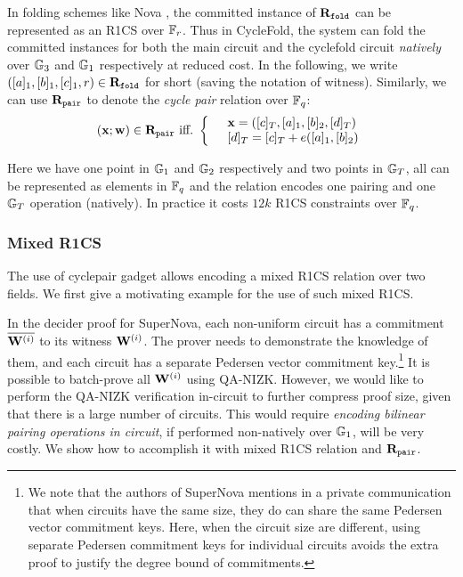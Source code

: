 In folding schemes like Nova \cite{Nova},
the committed instance of $\mathbf{R}_\texttt{fold}$ can be represented
as an R1CS over $\mathbb{F}_r$. Thus in CycleFold, the system
can fold the committed instances for both the main circuit and
the cyclefold circuit {\em natively} over ${\mathbb{G}}_3$ and ${\mathbb{G}}_1$ respectively
at reduced cost.  In the following, we write
$([a]_1, [b]_1, [c]_1, r) \in \mathbf{R}_\texttt{fold}$ for short (saving the
notation of witness). Similarly, we can use $\mathbf{R}_\texttt{pair}$
to denote the {\em cycle pair} relation over $\mathbb{F}_q$:
\[
	({{\mathbf {x}}};{{\mathbf {w}}}) \in \mathbf{R}_\texttt{pair}~\textrm{iff.}~
	\left\{
	\begin{array} {l l}
		& {{\mathbf {x}}} = ([c]_T, [a]_1, [b]_2, [d]_T)  \\
		& [d]_T = [c]_T + e([a]_1, [b]_2) \\
	\end{array}
	\right.
\]

Here we have one point in ${\mathbb{G}}_1$ and ${\mathbb{G}}_2$ respectively and
two points in ${\mathbb{G}}_T$, all can be represented as elements in 
$\mathbb{F}_q$ and the relation encodes one pairing and one ${\mathbb{G}}_T$
operation (natively). In practice it costs $12k$ R1CS constraints
over $\mathbb{F}_q$.

\subsubsection{Mixed R1CS} The use of cyclepair gadget allows
encoding a mixed R1CS relation over two fields. We first
give a motivating example for the use of such mixed R1CS. 

In the decider proof for SuperNova, each non-uniform circuit has
a commitment $\overline{{{\mathbf {W}}}^{(i)}}$ to its witness 
${{\mathbf {W}}}^{(i)}$. The prover needs to demonstrate the knowledge
of them, and each circuit has a separate Pedersen vector commitment 
key.\footnote{We note
that the authors of SuperNova mentions in a private communication that
when circuits have the same size, they do can share the same Pedersen
vector commitment keys. Here, when the circuit size are different, 
using separate Pedersen commitment keys for individual circuits
avoids the extra proof to justify the degree bound of
commitments.} It is possible to batch-prove all ${{\mathbf {W}}}^{(i)}$
using QA-NIZK. However, we would like to perform the QA-NIZK verification
in-circuit to further compress proof size, given that there is a large
number of circuits.  This would require
{\em encoding bilinear pairing operations in circuit}, if performed
non-natively over ${\mathbb{G}}_1$, will be very costly.  We show how to
accomplish it with mixed R1CS relation and $\mathbf{R}_\texttt{pair}$.

